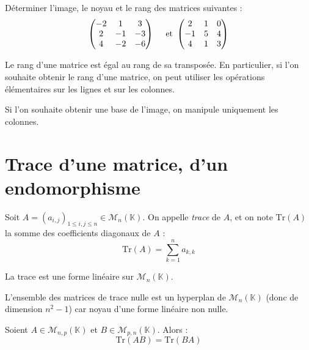 \documentclass[a4paper,10pt]{report}
\begin{document}
\begin{ApplicationDirecte} Déterminer l'image, le noyau et le rang des matrices suivantes :
$$ \begin{pmatrix}
-2 & 1 & 3 \\
2 & -1 & -3 \\
4 & -2 & -6 \\
\end{pmatrix} \quad \hbox{ et } \begin{pmatrix}
2 & 1 & 0 \\
-1 & 5 & 4 \\
4 & 1 & 3 \\
\end{pmatrix} $$
\end{ApplicationDirecte}

\begin{Theoreme}{} Le rang d'une matrice est égal au rang de sa transposée. 
En particulier, si l'on souhaite obtenir le rang d'une matrice, on peut utiliser les opérations élémentaires sur les lignes et sur les colonnes. 
\end{Theoreme}

\begin{att} Si l'on souhaite obtenir une base de l'image, on manipule uniquement les colonnes.
\end{att}
\section{Trace d'une matrice, d'un endomorphisme}

\begin{Definition}{} Soit $A=(a_{i,j})_{1 \leq i,j \leq n} \in \mathcal{M}_n(\mathbb{K})$. On appelle \emph{trace} de $A$, et on note $\textrm{Tr}(A)$ la somme des coefficients diagonaux de $A$ :
$$\textrm{Tr}(A) = \sum_{k=1}^n a_{k,k}$$
\end{Definition}

\begin{Proposition}{} La trace est une forme linéaire sur $\mathcal{M}_n( \mathbb{K})$.
\end{Proposition}

\begin{Exemple} L'ensemble des matrices de trace nulle est un hyperplan de $\mathcal{M}_n(\mathbb{K})$ (donc de dimension $n^2-1$) car noyau d'une forme linéaire non nulle.
\end{Exemple}

\begin{Proposition}{} Soient $A \in \mathcal{M}_{n,p}(\mathbb{K})$ et $B \in \mathcal{M}_{p,n}(\mathbb{K})$. Alors :
$$ \textrm{Tr}(AB) = \textrm{Tr}(BA) $$
\end{Proposition}
\end{document}

